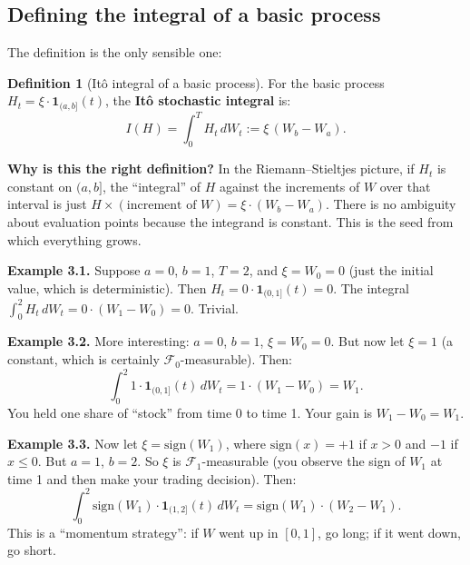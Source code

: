 \documentclass[11pt,a4paper]{article}
\theoremstyle{definition}
\newtheorem{definition}{Definition}[section]
\theoremstyle{plain}
\theoremstyle{remark}
\newcommand{\F}{\mathcal{F}}
\begin{document}
\subsection{Defining the integral of a basic process}

The definition is the only sensible one:

\begin{definition}[Itô integral of a basic process]
For the basic process $H_t = \xi \cdot \mathbf{1}_{(a,b]}(t)$, the \textbf{Itô stochastic integral} is:
\begin{equation}
  \label{eq:basic-integral}
  I(H) = \int_0^T H_t\,dW_t := \xi\,(W_b - W_a).
\end{equation}
\end{definition}

\begin{tutobox}
\textbf{Why is this the right definition?}
In the Riemann--Stieltjes picture, if $H_t$ is constant on $(a,b]$, the ``integral'' of $H$ against the increments of $W$ over that interval is just $H \times (\text{increment of } W) = \xi \cdot (W_b - W_a)$. There is no ambiguity about evaluation points because the integrand is constant. This is the seed from which everything grows.
\end{tutobox}

\begin{workedex}
\textbf{Example 3.1.} Suppose $a = 0$, $b = 1$, $T = 2$, and $\xi = W_0 = 0$ (just the initial value, which is deterministic). Then $H_t = 0 \cdot \mathbf{1}_{(0,1]}(t) = 0$. The integral $\int_0^2 H_t\,dW_t = 0 \cdot (W_1 - W_0) = 0$. Trivial.

\textbf{Example 3.2.} More interesting: $a = 0$, $b = 1$, $\xi = W_0 = 0$. But now let $\xi = 1$ (a constant, which is certainly $\F_0$-measurable). Then:
\[
  \int_0^2 1 \cdot \mathbf{1}_{(0,1]}(t)\,dW_t = 1 \cdot (W_1 - W_0) = W_1.
\]
You held one share of ``stock'' from time 0 to time 1. Your gain is $W_1 - W_0 = W_1$.

\textbf{Example 3.3.} Now let $\xi = \text{sign}(W_1)$, where $\text{sign}(x) = +1$ if $x > 0$ and $-1$ if $x \leq 0$. But $a = 1$, $b = 2$. So $\xi$ is $\F_1$-measurable (you observe the sign of $W_1$ at time 1 and then make your trading decision). Then:
\[
  \int_0^2 \text{sign}(W_1)\cdot \mathbf{1}_{(1,2]}(t)\,dW_t = \text{sign}(W_1) \cdot (W_2 - W_1).
\]
This is a ``momentum strategy'': if $W$ went up in $[0,1]$, go long; if it went down, go short.
\end{workedex}
\end{document}
